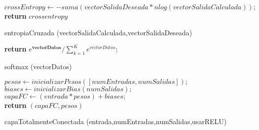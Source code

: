 \vskip 0.7cm
\begin{procedure}[H]
	\BlankLine
	$crossEntropy\gets -suma(vectorSalidaDeseada * nlog(vectorSalidaCalculada));$\\
	\textbf{return} $crossentropy$
	\caption{entropiaCruzada (vectorSalidaCalculada,vectorSalidaDeseada)}
\end{procedure}


\vskip 0.7cm
\begin{procedure}[H]
	\BlankLine
	\textbf{return} ${e^{\mathbf {vectorDatos}}} / {\sum _{k=1}^{K}e^{vectorDatos}};$
	\caption{softmax (vectorDatos)}
\end{procedure}



\begin{procedure}[H]
	\BlankLine
	$pesos\gets inicializarPesos([numEntradas, numSalidas]);$\\
	$biases\gets inicializarBias(numSalidas);$\\
	$capaFC\gets (entrada * pesos) + biases;$\\


	\textbf{return} $(capaFC, pesos)$
	\caption{capaTotalmenteConectada (entrada,numEntradas,numSalidas,usarRELU)}
\end{procedure}